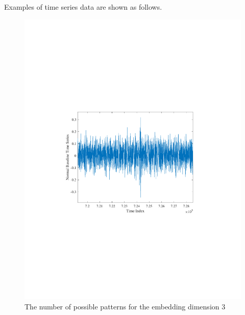 \documentclass[sn-basic,pdflatex]{sn-jnl}
\theoremstyle{remark}
\theoremstyle{definition}
\begin{document}
Examples of time series data are shown as follows.

\begin{figure}
\includegraphics{./normalbaselinetimeSeriesDE} \caption{The number of possible patterns for the embedding dimension 3}\label{fig:unnamed-chunk-2}
\end{figure}
\end{document}
